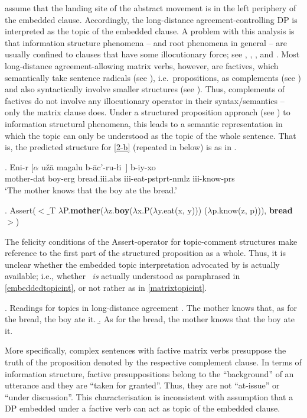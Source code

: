 \documentclass[output=paper
,modfonts
,nonflat]{langsci/langscibook}
\begin{document}
\cite{Polinsky&Potsdam:01} assume that the landing site of the
abstract movement is in the left periphery of the embedded
clause. Accordingly, the long-distance agreement-controlling DP is
interpreted as the topic of the embedded clause. A problem with this
analysis is that information structure phenomena -- and root phenomena
in general -- are usually confined to clauses that have some
illocutionary force; see \cite{Hooper&Thompson:73},
    \cite{Ebertetal08}, \cite{Krifkainprep}, and \cite{Maticetal14}. Most long-distance agreement-allowing
matrix verbs, however, are factives, which semantically take sentence
radicals (see \cite{Stenius67}), i.e.~propositions, as complements (see \cite{Krifka04})
 and also syntactically involve smaller
structures (see \cite{deCubaUrogdi10}). Thus, complements of
factives do not involve any illocutionary operator in their
syntax/semantics -- only the matrix clause does. Under a structured
proposition approach  (see \cite{Krifka92}) to information structural
phenomena, this leads to a semantic representation in which the topic
can only be understood as the topic of the whole sentence. That is,
the predicted structure for \ref{2-b}  (repeated in
\Next below) is as in \NNext.

\exg.  Eni-r [$\alpha$ u\v{z}\={a} \label{2d-b}magalu b-\={a}c'-ru-\l i~] b-iy-xo \\
     mother-{\sc dat} {} boy-{\sc erg} bread.{\sc iii.abs} {\sc iii}-eat-{\sc pstprt-nmlz} {\sc iii}-know-{\sc prs} \\
      `The mother knows that the boy ate the bread.'

\Lsciex. {\sc Assert}($<$$\_$T $\lambda$P.{\bf mother}($\lambda$z.{\bf boy}($\lambda$x.P($\lambda$y.eat(x, y))) ($\lambda$p.know(z, p))), {\bf bread}$>$)

The felicity conditions of the {\sc Assert}-operator for topic-comment
structures make reference to the first part of the structured
proposition as a whole. Thus, it is unclear whether the embedded topic interpretation
advocated by \cite{Polinsky&Potsdam:01}  is actually available;
i.e.,  whether \LLast\ {\it is} actually understood as paraphrased in \ref{embeddedtopicint}, or not rather as in \ref{matrixtopicint}.
   
\Lsciexi. Readings for topics in long-distance agreement
	\a. \label{embeddedtopicint}The mother knows that, as for the bread, the boy ate it.
	\b. \label{matrixtopicint}As for the bread, the mother knows that the boy ate it.

More specifically, complex sentences with factive matrix verbs
presuppose the truth of the proposition denoted by the respective
complement clause. In terms of information structure, factive
presuppositions belong to the ``background'' of an utterance and they
are ``taken for granted''. Thus, they are not ``at-issue'' or ``under
discussion''. This characterisation is inconsistent with
 assumption that a DP embedded under a factive verb
can act as topic of the embedded clause.
\end{document}
